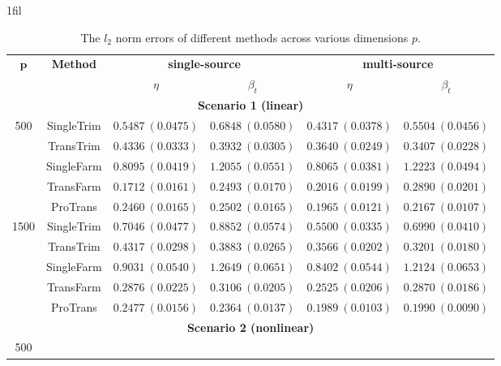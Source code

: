\documentclass[12pt]{article}
\makeatletter
\newcommand*{\centerfloat}{%
  \parindent \z@
  \leftskip \z@ \@plus 1fil \@minus \marginparwidth
  \rightskip \leftskip
  \parfillskip \z@skip}
\makeatother
\begin{document}
\begin{table}[!ht]
\renewcommand{\arraystretch}{0.6}
\footnotesize
    \centerfloat
    \caption{The $l_2$ norm errors of different methods across various dimensions $p$.}
    \label{tab:sup:l2_norm_p}
    \begin{tabular}{cccccc}
        \toprule
        \multirow{2}{*}{$\bm{p}$} & \multirow{2}{*}{\textbf{Method}} & \multicolumn{2}{c}{\textbf{single-source}} & \multicolumn{2}{c}{\textbf{multi-source}}\\
        \cmidrule(lr){3-4} \cmidrule(lr){5-6} 
        & & $\eta$ & $\beta_{t}$ & $\eta$& $\beta_{t}$ \\
        \midrule
        \multicolumn{6}{c}{\textbf{Scenario 1 (linear)}}\\
        \hline
        \multirow{5}{*}{500} 
        & SingleTrim  & $0.5487\ (0.0475)$ & $0.6848\ (0.0580)$ & $0.4317\ (0.0378)$ & $0.5504\ (0.0456)$ \\
        & TransTrim   & $0.4336\ (0.0333)$ & $0.3932\ (0.0305)$ & $0.3640\ (0.0249)$ & $0.3407\ (0.0228)$ \\
        & SingleFarm  & $0.8095\ (0.0419)$ & $1.2055\ (0.0551)$ & $0.8065\ (0.0381)$ & $1.2223\ (0.0494)$ \\
        & TransFarm   & $\bm{0.1712}\ (0.0161)$ & $\bm{0.2493}\ (0.0170)$ & $0.2016\ (0.0199)$ & $0.2890\ (0.0201)$\\
        & ProTrans    & $0.2460\ (0.0165)$ & $0.2502\ (0.0165)$ & $\bm{0.1965}\ (0.0121)$ & $\bm{0.2167}\ (0.0107)$ \\
        \hline
        \multirow{5}{*}{1500} 
        & SingleTrim  & $0.7046\ (0.0477)$ & $0.8852\ (0.0574)$ & $0.5500\ (0.0335)$ & $0.6990\ (0.0410)$ \\
        & TransTrim   & $0.4317\ (0.0298)$ & $0.3883\ (0.0265)$ & $0.3566\ (0.0202)$ & $0.3201\ (0.0180)$  \\
        & SingleFarm  & $0.9031\ (0.0540)$ & $1.2649\ (0.0651)$ & $0.8402\ (0.0544)$ & $1.2124\ (0.0653)$  \\
        & TransFarm   & $0.2876\ (0.0225)$ & $0.3106\ (0.0205)$ & $0.2525\ (0.0206)$ & $0.2870\ (0.0186)$ \\
        & ProTrans    & $\bm{0.2477}\ (0.0156)$ & $\bm{0.2364}\ (0.0137)$ & $\bm{0.1989}\ (0.0103)$ & $\bm{0.1990}\ (0.0090)$ \\
        \hline
         \multicolumn{6}{c}{\textbf{Scenario 2 (nonlinear)}}\\
         \hline
         \multirow{5}{*}{500} 

\end{tabular}
\end{table}
\end{document}
